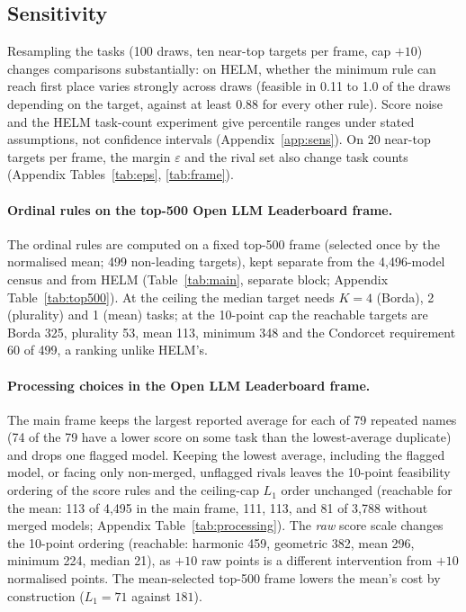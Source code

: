 \subsection{Sensitivity}
Resampling the tasks (100 draws, ten near-top targets per frame, cap $+10$) changes comparisons substantially: on HELM, whether the minimum rule can reach first place varies strongly across draws (feasible in 0.11 to 1.0 of the draws depending on the target, against at least 0.88 for every other rule). Score noise and the HELM task-count experiment give percentile ranges under stated assumptions, not confidence intervals (Appendix~\ref{app:sens}). On 20 near-top targets per frame, the margin $\varepsilon$ and the rival set also change task counts (Appendix Tables~\ref{tab:eps}, \ref{tab:frame}).

\paragraph{Ordinal rules on the top-500 Open LLM Leaderboard frame.} The ordinal rules are computed on a fixed top-500 frame (selected once by the normalised mean; 499 non-leading targets), kept separate from the 4,496-model census and from HELM (Table~\ref{tab:main}, separate block; Appendix Table~\ref{tab:top500}). At the ceiling the median target needs $K=4$ (Borda), 2 (plurality) and 1 (mean) tasks; at the 10-point cap the reachable targets are Borda 325, plurality 53, mean 113, minimum 348 and the Condorcet requirement 60 of 499, a ranking unlike HELM's.

\paragraph{Processing choices in the Open LLM Leaderboard frame.} The main frame keeps the largest reported average for each of 79 repeated names (74 of the 79 have a lower score on some task than the lowest-average duplicate) and drops one flagged model. Keeping the lowest average, including the flagged model, or facing only non-merged, unflagged rivals leaves the 10-point feasibility ordering of the score rules and the ceiling-cap $L_1$ order unchanged (reachable for the mean: 113 of 4{,}495 in the main frame, 111, 113, and 81 of 3{,}788 without merged models; Appendix Table~\ref{tab:processing}). The \emph{raw} score scale changes the 10-point ordering (reachable: harmonic 459, geometric 382, mean 296, minimum 224, median 21), as $+10$ raw points is a different intervention from $+10$ normalised points. The mean-selected top-500 frame lowers the mean's cost by construction ($L_1=71$ against $181$).
